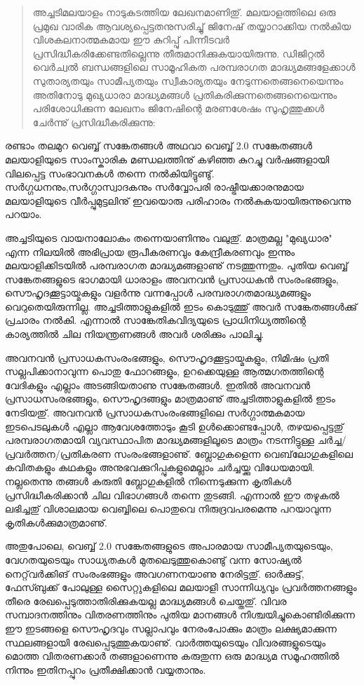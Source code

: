 \vskip 2pt

\begin{quotation}
അച്ചടിമലയാളം നാടുകടത്തിയ ലേഖനമാണിതു്. മലയാളത്തിലെ ഒരു പ്രമുഖ വാരിക ആവശ്യപ്പെട്ടതനുസരിച്ചു് ജിനേഷ് 
തയ്യാറാക്കിയ നല്‍കിയ വിശകലനാത്മകമായ ഈ കുറിപ്പു് പിന്നീടവര്‍ പ്രസിദ്ധീകരിക്കേണ്ടതില്ലെന്നു തീരുമാനിക്കുകയായിരുന്നു.
 ഡിജിറ്റല്‍ വെര്‍ച്വല്‍ ബന്ധങ്ങളിലെ സാമൂഹികത പരമ്പരാഗത മാദ്ധ്യമങ്ങളേക്കാള്‍ സുതാര്യതയും സാമീപ്യതയും സ്വീകാര്യതയും 
നേടുന്നതെങ്ങനെയെന്നും അതിനോടു മുഖ്യധാരാ മാദ്ധ്യമങ്ങള്‍ പ്രതികരിക്കുന്നതെങ്ങനെയെന്നും പരിശോധിക്കുന്ന ലേഖനം 
ജിനേഷിന്റെ മരണശേഷം സുഹൃത്തുക്കള്‍ ചേര്‍ന്നു് പ്രസിദ്ധീകരിക്കുന്നു:
\end{quotation}


രണ്ടാം തലമുറ വെബ്ബ് സങ്കേതങ്ങള്‍ അഥവാ വെബ്ബ് 2.0 സങ്കേതങ്ങള്‍ മലയാളിയുടെ സാംസ്കാരിക മണ്ഡലത്തിനു് കഴിഞ്ഞ കുറച്ചു 
വര്‍ഷങ്ങളായി വിലപ്പെട്ട സംഭാവനകള്‍ തന്നെ നല്‍കിയിട്ടുണ്ടു്. സര്‍ഗ്ഗധനനും,സര്‍ഗ്ഗാസ്വാദകനും സര്‍വ്വോപരി രാഷ്ട്രീയക്കാരനുമായ 
മലയാളിയുടെ വീര്‍പ്പുമുട്ടലിനു് ഇവയൊരു പരിഹാരം നല്‍കുകയായിരുന്നുവെന്നു പറയാം.

അച്ചടിയുടെ വായനാലോകം തന്നെയാണിന്നും വലുതു്. മാത്രമല്ല "മുഖ്യധാര" എന്ന നിലയില്‍ അഭിപ്രായ രൂപീകരണവും 
കേന്ദ്രീകരണവും ഇന്നും മലയാളിക്കിടയില്‍ പരമ്പരാഗത മാദ്ധ്യമങ്ങളാണു് നടത്തുന്നതും. പുതിയ വെബ്ബ് സങ്കേതങ്ങളുടെ ഭാഗമായി
 ധാരാളം അവനവന്‍ പ്രസാധകന്‍ സംരംഭങ്ങളും, സൌഹൃദക്കൂട്ടായ്മകളും വളര്‍ന്നു വന്നപ്പോള്‍ പരമ്പരാഗതമാദ്ധ്യമങ്ങളും 
വെറുതെയിരുന്നില്ല. അച്ചടിത്താളുകളില്‍ ഇടം കൊടുത്തു് അവര്‍ സങ്കേതങ്ങള്‍ക്കു് പ്രചാരം നല്‍കി. എന്നാല്‍ സാങ്കേതികവിദ്യയുടെ
 പ്രാധിനിധ്യത്തിന്റെ കാര്യത്തില്‍ ചില നിയന്ത്രണങ്ങള്‍ അവര്‍ ശരിക്കും പാലിച്ചു.

അവനവന്‍ പ്രസാധകസംരംഭങ്ങളും, സൌഹൃദക്കൂട്ടായ്മകളും, നിമിഷം പ്രതി സല്ലപിക്കാനാവുന്ന പൊതു ഫോറങ്ങളും, ഉറക്കെയുള്ള 
ആത്മഗതത്തിന്റെ വേദികളും എല്ലാം അടങ്ങിയതാണു സങ്കേതങ്ങള്‍. ഇതില്‍ അവനവന്‍ പ്രസാധസംരഭങ്ങളും, സൌഹൃദങ്ങളും
 മാത്രമാണു് അച്ചടിത്താളുകളില്‍ ഇടം നേടിയതു്. അവനവന്‍ പ്രസാധകസംരംഭങ്ങളിലെ സര്‍ഗ്ഗാത്മകമായ ഇടപെടലുകള്‍ എല്ലാ 
ആവേശത്തോടും കൂടി ഉള്‍ക്കൊണ്ടപ്പോള്‍, തഴയപ്പെട്ടതു് പരമ്പരാഗതമായി വ്യവസ്ഥാപിത മാദ്ധ്യമങ്ങളിലൂടെ മാത്രം നടന്നിട്ടുള്ള 
ചര്‍ച്ച/പ്രവര്‍ത്തന/പ്രതികരണ സംരംഭങ്ങളാണു്. ബ്ലോഗുകളെന്ന വെബ്‌ലോഗുകളിലെ കവിതകളും കഥകളും 
അനുഭവക്കുറിപ്പുകളുമെല്ലാം ചര്‍ച്ചയ്ക്കു വിധേയമായി. നല്ലതെന്നു തങ്ങള്‍ കരുതി ബ്ലോഗുകളില്‍ നിന്നെടുക്കുന്ന കൃതികള്‍ 
പ്രസിദ്ധീകരിക്കാന്‍ ചില വിഭാഗങ്ങള്‍ തന്നെ തുടങ്ങി. എന്നാല്‍ ഈ തഴുകല്‍ ലഭിച്ചതു് വിശാലമായ വെബ്ബിലെ പൊതുവെ 
നിരുദ്രവപരമെന്നു പറയാവുന്ന കൃതികള്‍ക്കുമാത്രമാണു്.

അതുപോലെ, വെബ്ബ് 2.0 സങ്കേതങ്ങളുടെ അപാരമായ സാമീപ്യതയുടെയും, വേഗതയുടെയും സാധ്യതകള്‍ മുതലെടുത്തുകൊണ്ടു് വന്ന
 സോഷ്യല്‍ നെറ്റ്‌വര്‍ക്കിങ് സംരംഭങ്ങളും അവഗണനയാണു നേരിട്ടതു്. ഓര്‍ക്കുട്ട്, ഫേസ്ബുക്ക് പോലുള്ള സൈറ്റുകളിലെ മലയാളി
 സാന്നിധ്യവും പ്രവര്‍ത്തനങ്ങളും തീരെ രേഖപ്പെടുത്താതിരിക്കുകയല്ല മാദ്ധ്യമങ്ങള്‍ ചെയ്തതു്. വിവര സമ്പാദനത്തിനും 
വിതരണത്തിനും പുതിയ മാനങ്ങള്‍ നിശ്ചയിച്ചുകൊണ്ടിരിക്കുന്ന ഈ ഇടങ്ങളെ സൌഹൃദവും സല്ലാപവും നേരംപോക്കും മാത്രം 
ലക്ഷ്യമാക്കുന്ന സ്ഥലങ്ങളായി രേഖപ്പെടുത്തുകയാണു്. വാര്‍ത്തയുടെയും വിവരങ്ങളുടെയും മൊത്ത വിതരണക്കാര്‍ തങ്ങളാണെന്നു
 കരുതുന്ന ഒരു മാദ്ധ്യമ സമൂഹത്തില്‍ നിന്നും ഇതിനപ്പുറം പ്രതീക്ഷിക്കാന്‍ വയ്യതാനും.

